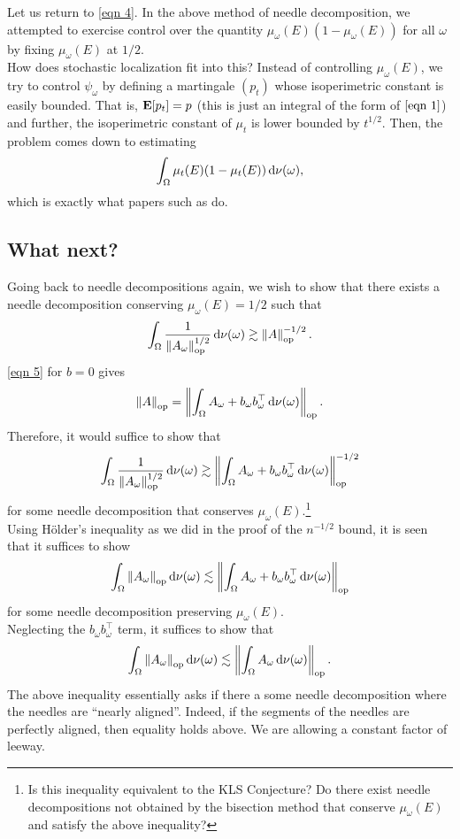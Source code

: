 \documentclass{article}
\begin{document}
Let us return to \eqref{eqn 4}. In the above method of needle decomposition, we attempted to exercise control over the quantity $\mu_\omega(E) ( 1 - \mu_\omega(E) )$ for all $\omega$ by fixing $\mu_\omega(E)$ at $1/2$.\\

How does stochastic localization fit into this? Instead of controlling $\mu_\omega(E)$, we try to control $\psi_\omega$ by defining a martingale $(p_t)$ whose isoperimetric constant is easily bounded. That is, $\textbf{E}[p_t] = p$ (this is just an integral of the form of $\eqref{eqn 1}$) and further, the isoperimetric constant of $\mu_t$ is lower bounded by $t^{1/2}$. Then, the problem comes down to estimating
\[ \int_\Omega \mu_t(E) ( 1 - \mu_t(E) ) \operatorname{d}\!{\nu(\omega)}, \]
which is exactly what papers such as \cite{chen2021constant} do.

\subsection{What next?}

Going back to needle decompositions again, we wish to show that there exists a needle decomposition conserving $\mu_\omega(E) = 1/2$ such that
\[ \int_{\Omega} \frac{1}{\left\lVert A_\omega\right\rVert_{\text{op}}^{1/2}} \operatorname{d}\!{\nu(\omega)} \gtrsim \left\lVert A\right\rVert_{\text{op}}^{-1/2}. \]
\eqref{eqn 5} for $b = 0$ gives
\[ \left\lVert A\right\rVert_{\text{op}} = \left\lVert\int_{\Omega} A_\omega + b_\omega b_\omega^\top \operatorname{d}\!{\nu(\omega)} \right\rVert_{\text{op}}. \]
Therefore, it would suffice to show that
\[ \int_\Omega \frac{1}{\left\lVert A_\omega\right\rVert_{\text{op}}^{1/2}} \operatorname{d}\!{\nu(\omega)} \gtrsim \left\lVert\int_{\Omega} A_\omega + b_\omega b_\omega^\top \operatorname{d}\!{\nu(\omega)} \right\rVert_{\text{op}}^{-1/2} \]
for some needle decomposition that conserves $\mu_\omega(E)$.\footnote{Is this inequality equivalent to the KLS Conjecture? Do there exist needle decompositions not obtained by the bisection method that conserve $\mu_\omega(E)$ and satisfy the above inequality?}\\

Using H\"{o}lder's inequality as we did in the proof of the $n^{-1/2}$ bound, it is seen that it suffices to show
\[ \int_\Omega \left\lVert A_\omega\right\rVert_{\text{op}} \operatorname{d}\!{\nu(\omega)} \lesssim \left\lVert \int_\Omega A_\omega + b_\omega b_\omega^\top \operatorname{d}\!{\nu(\omega)} \right\rVert_{\text{op}} \]
for some needle decomposition preserving $\mu_\omega(E)$.\\
Neglecting the $b_\omega b_\omega^\top$ term, it suffices to show that
\[ \int_\Omega \left\lVert A_\omega\right\rVert_{\text{op}} \operatorname{d}\!{\nu(\omega)} \lesssim \left\lVert \int_\Omega A_\omega \operatorname{d}\!{\nu(\omega)} \right\rVert_{\text{op}}. \]
The above inequality essentially asks if there a some needle decomposition where the needles are ``nearly aligned''. Indeed, if the segments of the needles are perfectly aligned, then equality holds above. We are allowing a constant factor of leeway.



\end{document}
